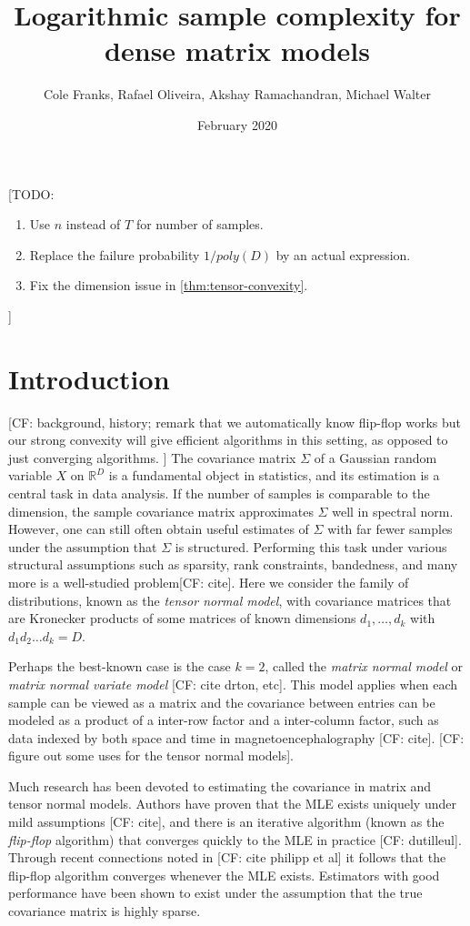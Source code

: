 \documentclass{article}
\title{Logarithmic sample complexity for dense matrix models}
\author{Cole Franks, Rafael Oliveira, Akshay Ramachandran, Michael Walter}
\date{February 2020}
\newcommand{\R}{{\mathbb{R}}}
\newcommand{\CF}[1]{{\color{purple}[CF: #1]}}
\newcommand{\TODO}[1]{{\color{blue}[TODO: #1]}}
\begin{document}
\maketitle
\tableofcontents
\TODO{
\begin{enumerate}
\item Use $n$ instead of $T$ for number of samples.
\item Replace the failure probability $1/poly(D)$ by an actual expression. 
\item Fix the dimension issue in \cref{thm:tensor-convexity}.
\end{enumerate}

}


\section{Introduction}
\CF{background, history; remark that we automatically know flip-flop works but our strong convexity will give efficient algorithms in this setting, as opposed to just converging algorithms. } 
The covariance matrix $\Sigma$ of a Gaussian random variable $X$ on $\R^D$ is a fundamental object in statistics, and its estimation is a central task in data analysis. If the number of samples is comparable to the dimension, the sample covariance matrix approximates $\Sigma$ well in spectral norm. However, one can still often obtain useful estimates of $\Sigma$ with far fewer samples under the assumption that $\Sigma$ is structured. Performing this task under various structural assumptions such as sparsity, rank constraints, bandedness, and many more is a well-studied problem\CF{cite}. Here we consider the family of distributions, known as the \emph{tensor normal model}, with covariance matrices that are Kronecker products of some matrices of known dimensions $d_1, \dots, d_k$ with $d_1d_2\dots d_k = D$.

Perhaps the best-known case is the case $k = 2$, called the \emph{matrix normal model} or  \emph{matrix normal variate model} \CF{cite drton, etc}. This model applies when each sample can be viewed as a matrix and the covariance between entries can be modeled as a product of a inter-row factor and a inter-column factor, such as data indexed by both space and time in magnetoencephalography \CF{cite}. \CF{figure out some uses for the tensor normal models}. 

Much research has been devoted to estimating the covariance in matrix and tensor normal models. Authors have proven that the MLE exists uniquely under mild assumptions \CF{cite}, and there is an iterative algorithm (known as the \emph{flip-flop} algorithm) that converges quickly to the MLE in practice \CF{dutilleul}. Through recent connections noted in \CF{cite philipp et al} it follows that the flip-flop algorithm converges whenever the MLE exists. Estimators with good performance have been shown to exist under the assumption that the true covariance matrix is highly sparse. 
\end{document}
